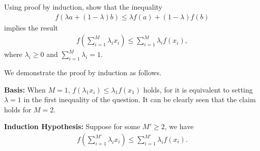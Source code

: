 \begin{question}{1.38}
	Using proof by induction, show that the inequality
	\begin{align*}
		f(\lambda a + (1-\lambda) b) \leq \lambda f(a) + (1-\lambda) f(b)
	\end{align*}
	implies the result
	\begin{align*}
		f\left( \sum_{i = 1}^{M} \lambda_i x_i \right) \leq \sum_{i = 1}^{M} \lambda_i f(x_i),
	\end{align*}
	where $\lambda_i \geq 0$ and $\sum_{i = 1}^M \lambda_i = 1$.
\end{question}

\begin{answer}{}
	We demonstrate the proof by induction as follows.
	
	\noindent\textbf{Basis:} When $M = 1$, $f(\lambda_1 x_i) \leq \lambda_1f(x_1)$ holds, for it is equivalent to setting $\lambda = 1$ in the first inequality of the question. It can be clearly seen that the claim holds for $M = 2$.
	
	\noindent\textbf{Induction Hypothesis:} Suppose for some $M' \geq 2$, we have
	\begin{align}
		f\left( \sum_{i = 1}^{M'} \lambda_i x_i \right) \leq \sum_{i = 1}^{M'} \lambda_i f(x_i).
	\end{align}
	

\end{answer}
